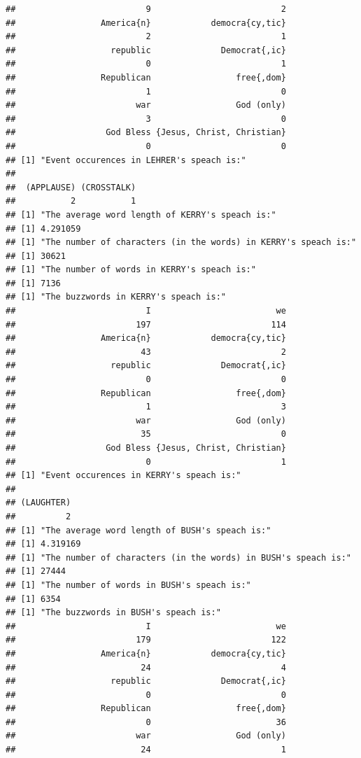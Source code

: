 \documentclass{article}\usepackage[]{graphicx}\usepackage[]{color}
\makeatletter
\newenvironment{kframe}{%
 \def\at@end@of@kframe{}%
 \ifinner\ifhmode%
  \def\at@end@of@kframe{\end{minipage}}%
  \begin{minipage}{\columnwidth}%
 \fi\fi%
 \def\FrameCommand##1{\hskip\@totalleftmargin \hskip-\fboxsep
 \colorbox{shadecolor}{##1}\hskip-\fboxsep
     \hskip-\linewidth \hskip-\@totalleftmargin \hskip\columnwidth}%
 \MakeFramed {\advance\hsize-\width
   \@totalleftmargin\z@ \linewidth\hsize
   \@setminipage}}%
 {\par\unskip\endMakeFramed%
 \at@end@of@kframe}
\newenvironment{knitrout}{}{} %
\makeatother
\begin{document}
\begin{knitrout}
\begin{kframe}
\begin{verbatim}
##                          9                          2 
##                 America{n}            democra{cy,tic} 
##                          2                          1 
##                   republic              Democrat{,ic} 
##                          0                          1 
##                 Republican                 free{,dom} 
##                          1                          0 
##                        war                 God (only) 
##                          3                          0 
##                  God Bless {Jesus, Christ, Christian} 
##                          0                          0 
## [1] "Event occurences in LEHRER's speach is:"
## 
##  (APPLAUSE) (CROSSTALK) 
##           2           1 
## [1] "The average word length of KERRY's speach is:"
## [1] 4.291059
## [1] "The number of characters (in the words) in KERRY's speach is:"
## [1] 30621
## [1] "The number of words in KERRY's speach is:"
## [1] 7136
## [1] "The buzzwords in KERRY's speach is:"
##                          I                         we 
##                        197                        114 
##                 America{n}            democra{cy,tic} 
##                         43                          2 
##                   republic              Democrat{,ic} 
##                          0                          0 
##                 Republican                 free{,dom} 
##                          1                          3 
##                        war                 God (only) 
##                         35                          0 
##                  God Bless {Jesus, Christ, Christian} 
##                          0                          1 
## [1] "Event occurences in KERRY's speach is:"
## 
## (LAUGHTER) 
##          2 
## [1] "The average word length of BUSH's speach is:"
## [1] 4.319169
## [1] "The number of characters (in the words) in BUSH's speach is:"
## [1] 27444
## [1] "The number of words in BUSH's speach is:"
## [1] 6354
## [1] "The buzzwords in BUSH's speach is:"
##                          I                         we 
##                        179                        122 
##                 America{n}            democra{cy,tic} 
##                         24                          4 
##                   republic              Democrat{,ic} 
##                          0                          0 
##                 Republican                 free{,dom} 
##                          0                         36 
##                        war                 God (only) 
##                         24                          1 

\end{verbatim}
\end{kframe}
\end{knitrout}
\end{document}
